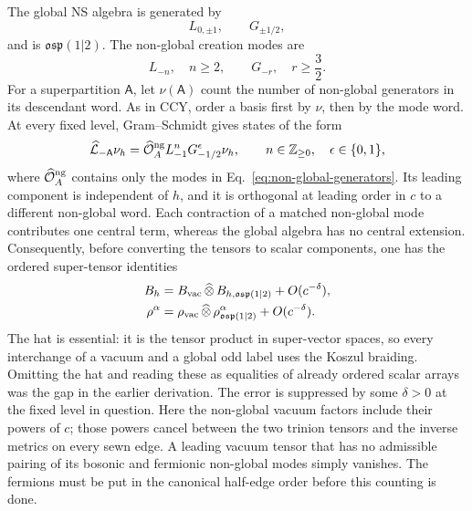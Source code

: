 \documentclass[11pt]{article}
\newcommand{\osp}{\mathfrak{osp}(1|2)}
\begin{document}
The global NS algebra is generated by
\begin{equation}
 L_{0,\pm1},
 \qquad
 G_{\pm1/2},
 \label{eq:global-generators}
\end{equation}
and is \(\osp\).  The non-global creation modes are
\begin{equation}
 L_{-n},\quad n\ge2,
 \qquad
 G_{-r},\quad r\ge\frac32.
 \label{eq:non-global-generators}
\end{equation}
For a superpartition \(\mathsf A\), let \(\nu(\mathsf A)\) count the number
of non-global generators in its descendant word.  As in CCY, order a basis
first by \(\nu\), then by the mode word.  At every fixed level,
Gram--Schmidt gives states of the form
\begin{equation}
 \widehat{\mathcal L}_{-\mathsf A}\nu_h
 =\widehat{\mathcal O}_{A}^{\rm ng}
  L_{-1}^{n}G_{-1/2}^{\epsilon}\nu_h,
 \qquad n\in\mathbb Z_{\ge0},\quad\epsilon\in\{0,1\},
 \label{eq:split-basis}
\end{equation}
where \(\widehat{\mathcal O}_{A}^{\rm ng}\) contains only the modes in
Eq.~\eqref{eq:non-global-generators}.  Its leading component is independent
of \(h\), and it is orthogonal at leading order in \(c\) to a different
non-global word.  Each contraction of a matched non-global mode contributes
one central term, whereas the global algebra has no central extension.
Consequently, before converting the tensors to scalar components, one has
the ordered super-tensor identities
\begin{align}
 B_h
 &=B_{\rm vac}\,\widehat\otimes\,B_{h,\osp}
   +O(c^{-\delta}),
 \label{eq:metric-factorization}\\
 \rho^\alpha
 &=\rho_{\rm vac}\,\widehat\otimes\,\rho_{\osp}^{\alpha}
   +O(c^{-\delta}).
 \label{eq:vertex-factorization}
\end{align}
The hat is essential: it is the tensor product in super-vector spaces, so
every interchange of a vacuum and a global odd label uses the Koszul
braiding.  Omitting the hat and reading these as equalities of already
ordered scalar arrays was the gap in the earlier derivation.
The error is suppressed by some \(\delta>0\) at the fixed level in question.
Here the non-global vacuum factors include their powers of \(c\); those
powers cancel between the two trinion tensors and the inverse metrics on
every sewn edge.  A leading vacuum tensor that has no admissible pairing of
its bosonic and fermionic non-global modes simply vanishes.  The fermions
must be put in the canonical half-edge order before this counting is done.
\end{document}
